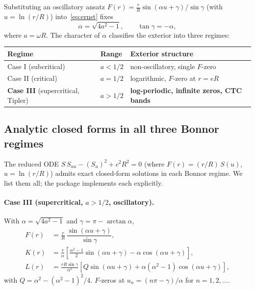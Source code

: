 \documentclass[11pt,a4paper]{article}
\begin{document}
Substituting an oscillatory ansatz
$F(r) = \tfrac{r}{R} \sin(\alpha u + \gamma) / \sin\gamma$ (with
$u = \ln(r/R)$) into~\eqref{eq:ernst} fixes
\begin{equation}
\label{eq:alpha}
\alpha = \sqrt{4 a^2 - 1}, \qquad
\tan\gamma = -\alpha,
\end{equation}
where $a = \omega R$. The character of $\alpha$ classifies the
exterior into three regimes:

\begin{center}
\begin{tabular}{lll}
\toprule
Regime & Range & Exterior structure \\
\midrule
Case I (subcritical) & $a < 1/2$ & non-oscillatory, single $F$-zero \\
Case II (critical)   & $a = 1/2$ & logarithmic, $F$-zero at $r = e R$ \\
\textbf{Case III} (supercritical, Tipler) & $a > 1/2$
& \textbf{log-periodic, infinite zeros, CTC bands} \\
\bottomrule
\end{tabular}
\end{center}

\subsection{Analytic closed forms in all three Bonnor regimes}
\label{sec:caseiii}

The reduced ODE $S\,S_{uu} - (S_u)^2 + c^2 R^2 = 0$ (where
$F(r) = (r/R)\,S(u)$, $u = \ln(r/R)$) admits exact closed-form
solutions in each Bonnor regime. We list them all; the package
implements each explicitly.

\paragraph{Case III (supercritical, $a > 1/2$, oscillatory).}
With $\alpha = \sqrt{4 a^2 - 1}$ and $\gamma = \pi - \arctan\alpha$,
\begin{align}
F(r) &= \tfrac{r}{R}\,\dfrac{\sin(\alpha u + \gamma)}{\sin\gamma}, \\[4pt]
K(r) &= \tfrac{r}{\alpha}\!\left[ \tfrac{\alpha^2 - 1}{2}
        \sin(\alpha u + \gamma) - \alpha \cos(\alpha u + \gamma) \right], \\[4pt]
L(r) &= \tfrac{r R \sin\gamma}{\alpha^2}\!\left[
        Q \sin(\alpha u + \gamma) + \alpha (\alpha^2 - 1)
        \cos(\alpha u + \gamma) \right],
\end{align}
with $Q = \alpha^2 - (\alpha^2 - 1)^2/4$. $F$-zeros at
$u_n = (n\pi - \gamma)/\alpha$ for $n = 1, 2, \ldots$.
\end{document}
